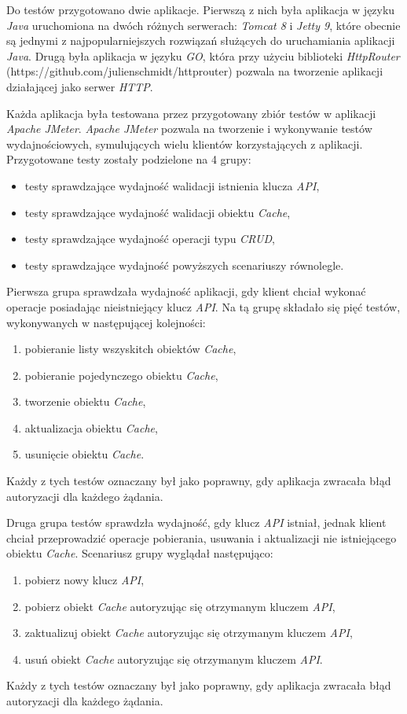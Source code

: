 Do testów przygotowano dwie aplikacje. Pierwszą z nich była aplikacja w języku \textsl{Java} uruchomiona na dwóch różnych serwerach: \textsl{Tomcat 8} i \textsl{Jetty 9}, które obecnie są jednymi z najpopularniejszych rozwiązań służących do uruchamiania aplikacji \textsl{Java}. Drugą była aplikacja w języku \textsl{GO}, która przy użyciu biblioteki \textsl{HttpRouter} (https://github.com/julienschmidt/httprouter) pozwala na tworzenie aplikacji działającej jako serwer \textsl{HTTP}.

Każda aplikacja była testowana przez przygotowany zbiór testów w aplikacji \textsl{Apache JMeter}. \textsl{Apache JMeter} pozwala na tworzenie i wykonywanie testów wydajnościowych, symulujących wielu klientów korzystających z aplikacji. Przygotowane testy zostały podzielone na 4 grupy:
\begin{itemize}
    \item testy sprawdzające wydajność walidacji istnienia klucza \textsl{API},
    \item testy sprawdzające wydajność walidacji obiektu \textsl{Cache},
    \item testy sprawdzające wydajność operacji typu \textsl{CRUD},
    \item testy sprawdzające wydajność powyższych scenariuszy równolegle.
\end{itemize}

Pierwsza grupa sprawdzała wydajność aplikacji, gdy klient chciał wykonać operacje posiadając nieistniejący klucz \textsl{API}. Na tą grupę składało się pięć testów, wykonywanych w następującej kolejności:
\begin{enumerate}
    \item pobieranie listy wszyskitch obiektów \textsl{Cache},
    \item pobieranie pojedynczego obiektu \textsl{Cache},
    \item tworzenie obiektu \textsl{Cache},
    \item aktualizacja obiektu \textsl{Cache}, 
    \item usunięcie obiektu \textsl{Cache}.
\end{enumerate}
Każdy z tych testów oznaczany był jako poprawny, gdy aplikacja zwracała błąd autoryzacji dla każdego żądania.

Druga grupa testów sprawdzła wydajność, gdy klucz \textsl{API} istniał, jednak klient chciał przeprowadzić operacje pobierania, usuwania i aktualizacji nie istniejącego obiektu \textsl{Cache}. Scenariusz grupy wyglądał następująco:
\begin{enumerate}
    \item pobierz nowy klucz \textsl{API},
    \item pobierz obiekt \textsl{Cache} autoryzując się otrzymanym kluczem \textsl{API},
    \item zaktualizuj obiekt \textsl{Cache} autoryzując się otrzymanym kluczem \textsl{API},
    \item usuń obiekt \textsl{Cache} autoryzując się otrzymanym kluczem \textsl{API}.
\end{enumerate}
Każdy z tych testów oznaczany był jako poprawny, gdy aplikacja zwracała błąd autoryzacji dla każdego żądania.

